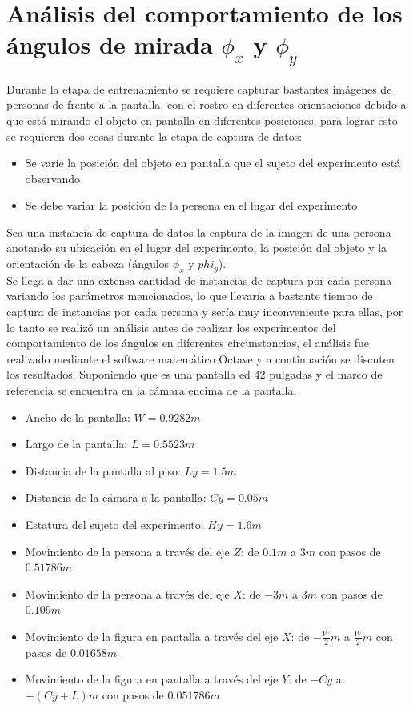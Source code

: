 \section{Análisis del comportamiento de los ángulos de mirada $\phi_x$ y $\phi_y$}
Durante la etapa de entrenamiento se requiere capturar bastantes imágenes de personas de frente a la pantalla, con el rostro en diferentes orientaciones debido a que está mirando el objeto en pantalla en diferentes posiciones, para lograr esto se requieren dos cosas durante la etapa de captura de datos:
\begin{itemize}
	\item Se varíe la posición del objeto en pantalla que el sujeto del experimento está observando 
	\item Se debe variar la posición de la persona en el lugar del experimento
\end{itemize}
Sea una instancia de captura de datos la captura de la imagen de una persona anotando su ubicación en el lugar del experimento, la posición del objeto y la orientación de la cabeza (ángulos $\phi_x$ y $phi_y$).
\\Se llega a dar una extensa cantidad de instancias de captura por cada persona variando los parámetros mencionados, lo que llevaría a bastante tiempo de captura de instancias por cada persona y sería muy inconveniente para ellas, por lo tanto se realizó un análisis antes de realizar los experimentos del comportamiento de los ángulos en diferentes circunstancias, el análisis fue realizado mediante el software matemático Octave y a continuación se discuten los resultados.
Suponiendo que es una pantalla ed 42 pulgadas y el marco de referencia se encuentra en la cámara encima de la pantalla.
\begin{itemize}
	\item Ancho de la pantalla: $W=0.9282m$
	\item Largo de la pantalla: $L=0.5523m$
	\item Distancia de la pantalla al piso: $Ly=1.5m$
	\item Distancia de la cámara a la pantalla: $Cy=0.05m$
	\item Estatura del sujeto del experimento: $Hy=1.6m$
	\item Movimiento de la persona a través del eje $Z$: de $0.1m$ a $3m$ con pasos de $0.51786m$
	\item Movimiento de la persona a través del eje $X$: de $-3m$ a $3m$ con pasos de $0.109m$
	\item Movimiento de la figura en pantalla a través del eje $X$: de $-\frac{W}{2}m$ a $\frac{W}{2}m$ con pasos de $0.01658m$
	\item Movimiento de la figura en pantalla a través del eje $Y$: de $-Cy$ a $-(Cy+L)m$ con pasos de $0.051786m$
\end{itemize}

